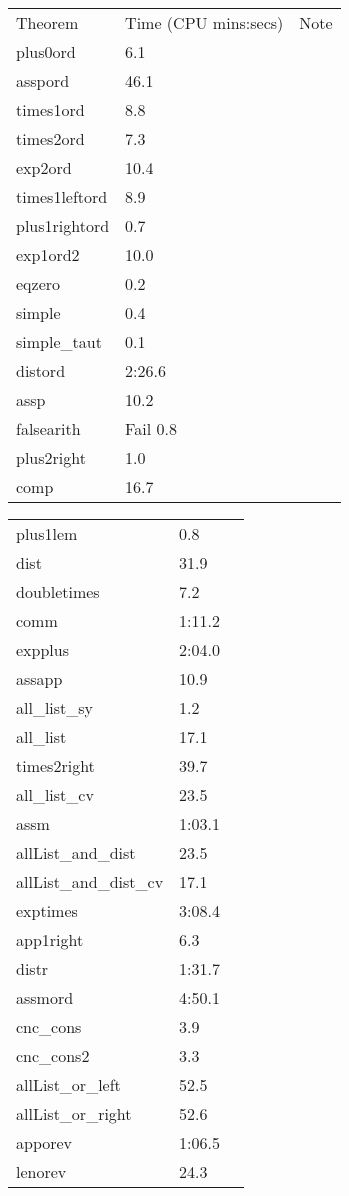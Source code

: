 \begin{center}\begin{supertabular}[t]{llp{2in}}
Theorem & Time (CPU mins:secs) & Note\\
plus0ord & 6.1 & \\
asspord & 46.1 & \\
times1ord & 8.8 & \\
times2ord & 7.3 & \\
exp2ord & 10.4 & \\
times1leftord & 8.9 & \\
plus1rightord & 0.7 & \\
exp1ord2 & 10.0 & \\
eqzero & 0.2 & \\
simple & 0.4 & \\
simple\_taut & 0.1 & \\
distord & 2:26.6 & \\
assp & 10.2 & \\
falsearith & Fail 0.8 & \\
plus2right & 1.0 & \\
comp & 16.7 & \\
\end{supertabular}

\begin{supertabular}[t]{llp{2in}}
plus1lem & 0.8 & \\
dist & 31.9 & \\
doubletimes & 7.2 & \\
comm & 1:11.2 & \\
expplus & 2:04.0 & \\
assapp & 10.9 & \\
all\_list\_sy & 1.2 & \\
all\_list & 17.1 & \\
times2right & 39.7 & \\
all\_list\_cv & 23.5 & \\
assm & 1:03.1 & \\
allList\_and\_dist & 23.5 & \\
allList\_and\_dist\_cv & 17.1 & \\
exptimes & 3:08.4 & \\
app1right & 6.3 & \\
distr & 1:31.7 & \\
assmord & 4:50.1 & \\
cnc\_cons & 3.9 & \\
cnc\_cons2 & 3.3 & \\
allList\_or\_left & 52.5 & \\
allList\_or\_right & 52.6 & \\
apporev & 1:06.5 & \\
lenorev & 24.3 & \\
\end{supertabular}


\end{center}
